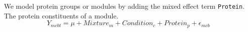 \documentclass[11pt]{elife}\usepackage[]{graphicx}\usepackage[]{color}
\begin{document}
We model protein groups or modules by adding the mixed effect term
\texttt{Protein}. The protein constituents of a module.\\

\begin{equation} 
	Y_{mcbt} = \mu + Mixture_m + Condition_c + Protein_p + \epsilon_{mcb}
\end{equation}

\end{document}
